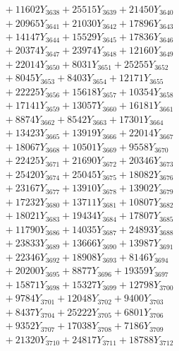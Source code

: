 \documentclass[a4paper,10pt]{article}
\begin{document}
{\begin{align}
&\;  + 11602 Y_{3638} + 25515 Y_{3639} + 21450 Y_{3640} \\[0.3ex]
&\;  + 20965 Y_{3641} + 21030 Y_{3642} + 17896 Y_{3643} \\[0.3ex]
&\;  + 14147 Y_{3644} + 15529 Y_{3645} + 17836 Y_{3646} \\[0.3ex]
&\;  + 20374 Y_{3647} + 23974 Y_{3648} + 12160 Y_{3649} \\[0.3ex]
&\;  + 22014 Y_{3650} + 8031 Y_{3651} + 25255 Y_{3652} \\[0.3ex]
&\;  + 8045 Y_{3653} + 8403 Y_{3654} + 12171 Y_{3655} \\[0.3ex]
&\;  + 22225 Y_{3656} + 15618 Y_{3657} + 10354 Y_{3658} \\[0.5ex]\allowbreak
&\;  + 17141 Y_{3659} + 13057 Y_{3660} + 16181 Y_{3661} \\[0.3ex]
&\;  + 8874 Y_{3662} + 8542 Y_{3663} + 17301 Y_{3664} \\[0.3ex]
&\;  + 13423 Y_{3665} + 13919 Y_{3666} + 22014 Y_{3667} \\[0.3ex]
&\;  + 18067 Y_{3668} + 10501 Y_{3669} + 9558 Y_{3670} \\[0.3ex]
&\;  + 22425 Y_{3671} + 21690 Y_{3672} + 20346 Y_{3673} \\[0.3ex]
&\;  + 25420 Y_{3674} + 25045 Y_{3675} + 18082 Y_{3676} \\[0.3ex]
&\;  + 23167 Y_{3677} + 13910 Y_{3678} + 13902 Y_{3679} \\[0.3ex]
&\;  + 17232 Y_{3680} + 13711 Y_{3681} + 10807 Y_{3682} \\[0.3ex]
&\;  + 18021 Y_{3683} + 19434 Y_{3684} + 17807 Y_{3685} \\[0.3ex]
&\;  + 11790 Y_{3686} + 14035 Y_{3687} + 24893 Y_{3688} \\[0.5ex]\allowbreak
&\;  + 23833 Y_{3689} + 13666 Y_{3690} + 13987 Y_{3691} \\[0.3ex]
&\;  + 22346 Y_{3692} + 18908 Y_{3693} + 8146 Y_{3694} \\[0.3ex]
&\;  + 20200 Y_{3695} + 8877 Y_{3696} + 19359 Y_{3697} \\[0.3ex]
&\;  + 15871 Y_{3698} + 15327 Y_{3699} + 12798 Y_{3700} \\[0.3ex]
&\;  + 9784 Y_{3701} + 12048 Y_{3702} + 9400 Y_{3703} \\[0.3ex]
&\;  + 8437 Y_{3704} + 25222 Y_{3705} + 6801 Y_{3706} \\[0.3ex]
&\;  + 9352 Y_{3707} + 17038 Y_{3708} + 7186 Y_{3709} \\[0.3ex]
&\;  + 21320 Y_{3710} + 24817 Y_{3711} + 18788 Y_{3712} \\[0.3ex]

\end{align}}
\end{document}
